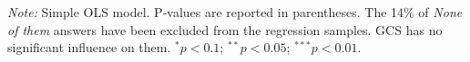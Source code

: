 \begin{bibunit}
\begin{table}[h]
  \caption[Influence of the GCS on electoral prospects]{Preference for a progressive platform depending on whether it includes the GCS or not. (Question \ref{q:conjoint_c}) 
} %
  \makebox[\textwidth][c]{}\label{tab:conjoint_c}
  {\footnotesize \textit{Note:} Simple OLS model. P-values are reported in parentheses. The 14\% of \textit{None of them} answers have been excluded from the regression samples. GCS has no significant influence on them. $^{*}p<0.1$; $^{**} p<0.05$; $^{***} p<0.01$. 
  }
\end{table}

\renewcommand{\url}[1]{\href{#1}{Link}} %
% 

\clearpage

\putbib
\end{bibunit}

